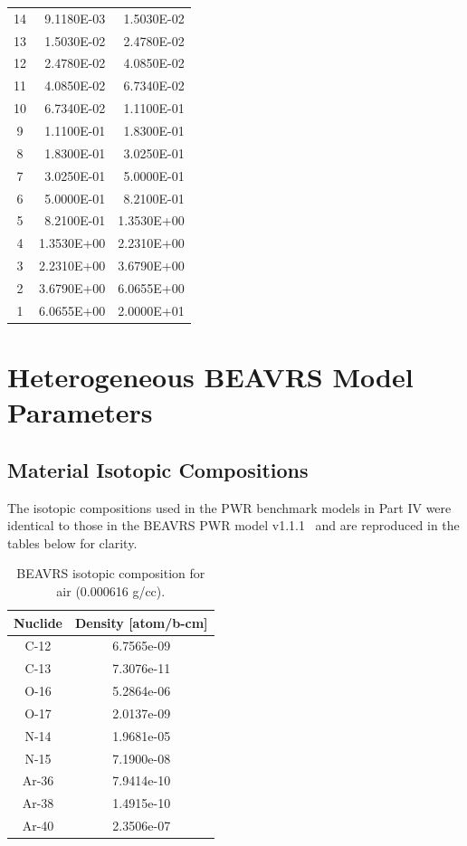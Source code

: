 \begin{appendices}
{\begin{longtable}[h!]{c r r}
14 & 9.1180E-03 & 1.5030E-02 \\
13 & 1.5030E-02 & 2.4780E-02 \\
12 & 2.4780E-02 & 4.0850E-02 \\
11 & 4.0850E-02 & 6.7340E-02 \\
10 & 6.7340E-02 & 1.1100E-01 \\
9 & 1.1100E-01 & 1.8300E-01 \\
8 & 1.8300E-01 & 3.0250E-01 \\
7 & 3.0250E-01 & 5.0000E-01 \\
6 & 5.0000E-01 & 8.2100E-01 \\
5 & 8.2100E-01 & 1.3530E+00 \\
4 & 1.3530E+00 & 2.2310E+00 \\
3 & 2.2310E+00 & 3.6790E+00 \\
2 & 3.6790E+00 & 6.0655E+00 \\
1 & 6.0655E+00 & 2.0000E+01 \\
  \bottomrule
\end{longtable}}


\chapter{Heterogeneous BEAVRS Model Parameters}
\label{app:beavrs-benchmarks}

\section{Material Isotopic Compositions}
\label{sec:beavrs-materials}

The isotopic compositions used in the \ac{PWR} benchmark models in Part IV were identical to those in the \ac{BEAVRS} \ac{PWR} model v1.1.1~\cite{horelik2013beavrs} and are reproduced in the tables below for clarity.

\begin{table}[h!]
  \centering
  \caption[BEAVRS isotopic composition for air]{BEAVRS isotopic composition for air (0.000616 g/cc).}
  \footnotesize
  \label{table:chap7-beavrs-isotopes-air}
  \vspace{6pt}
  \begin{tabular}{c c}
  \toprule
  \rowcolor{lightgray}
  {\bf Nuclide} &
  {\bf Density [atom/b-cm]} \\
  \midrule
  C-12 & 6.7565e-09 \\
  C-13 & 7.3076e-11 \\
  O-16 & 5.2864e-06 \\
  O-17 & 2.0137e-09 \\
  N-14 & 1.9681e-05 \\
  N-15 & 7.1900e-08 \\
  Ar-36 & 7.9414e-10 \\
  Ar-38 & 1.4915e-10 \\
  Ar-40 & 2.3506e-07 \\
  \bottomrule
\end{tabular}
\end{table}


\end{appendices}
